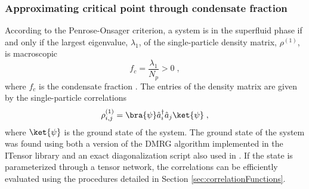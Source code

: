 \subsubsection{Approximating critical point through condensate fraction}

According to the Penrose-Onsager criterion, a system is in the superfluid phase if and only if the largest eigenvalue, $\lambda_1$, of the single-particle density matrix, $\rho^{(1)}$, is macroscopic
\begin{equation}
	f_c = \frac{\lambda_1}{N_p} > 0 \; ,
	\label{eq:condensateFraction}
\end{equation} 
where $f_c$ is the condensate fraction \cite{PenroseOnsager}. The entries of the density matrix are given by the single-particle correlations
\begin{equation}
	\rho_{i,j}^{(1)} = \bra{\psi} \hat{a}_{i}^{\dag} \hat{a}_{j} \ket{\psi} \; ,
	\label{eq:DensityMatrixEntry}
\end{equation}
where $\ket{\psi}$ is the ground state of the system. The ground state of the system was found using both a version of the DMRG algorithm implemented in the ITensor library \cite{ITensor} and an exact diagonalization script also used in \cite{MajaJulie}. If the state is parameterized through a tensor network, the correlations can be efficiently evaluated using the procedures detailed in Section \ref{sec:correlationFunctions}.

